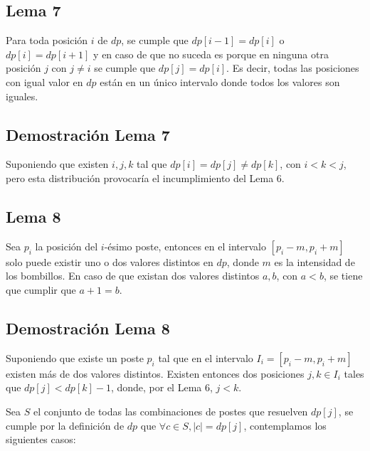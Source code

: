 \documentclass{article}
\begin{document}
\subsection*{Lema 7}
Para toda posición \( i \) de \( dp \), se cumple que \( dp[i - 1] = dp[i] \) o \( dp[i] = dp[i + 1] \) y en caso de que no suceda es porque en ninguna otra posición \( j \) con \( j \neq i \) se cumple que \( dp[j] = dp[i] \). Es decir, todas las posiciones con igual valor en \( dp \) están en un único intervalo donde todos los valores son iguales.

\subsection*{Demostración Lema 7}
Suponiendo que existen \( i, j, k \) tal que \( dp[i] = dp[j] \neq dp[k] \), con \( i < k < j \), pero esta distribución provocaría el incumplimiento del Lema 6.

\subsection*{Lema 8}
Sea \( p_i \) la posición del \( i \)-ésimo poste, entonces en el intervalo \([p_i - m, p_i + m]\) solo puede existir uno o dos valores distintos en \( dp \), donde \( m \) es la intensidad de los bombillos. En caso de que existan dos valores distintos \( a, b \), con \( a < b \), se tiene que cumplir que \( a + 1 = b \).

\subsection*{Demostración Lema 8}
Suponiendo que existe un poste \( p_i \) tal que en el intervalo \( I_i = [p_i - m, p_i + m] \) existen más de dos valores distintos. Existen entonces dos posiciones \( j, k \in I_i \) tales que \( dp[j] < dp[k] - 1 \), donde, por el Lema 6, \( j < k \).

Sea \( S \) el conjunto de todas las combinaciones de postes que resuelven \( dp[j] \), se cumple por la definición de \( dp \) que \( \forall c \in S, |c| = dp[j] \), contemplamos los siguientes casos:
\end{document}
